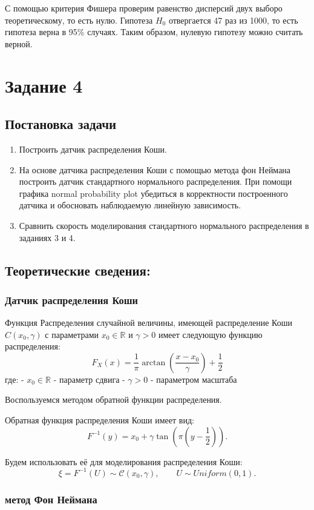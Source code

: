 \documentclass[11pt]{article}
\begin{document}
С помощью критерия Фишера проверим равенство дисперсий двух выборо теоретическому, то есть нулю. Гипотеза $H_0$ отвергается 47 раз из 1000, то есть гипотеза верна в 95\% случаях. Таким образом, нулевую гипотезу можно считать верной.

\section{Задание 4}
\subsection{Постановка задачи}

\begin{enumerate}
\item Построить датчик распределения Коши.
\item На основе датчика распределения Коши с помощью метода фон Неймана построить датчик стандартного нормального распределения. При помощи графика normal probability plot убедиться в корректности построенного датчика и обосновать наблюдаемую линейную зависимость.
\item Сравнить скорость моделирования стандартного нормального распределения в заданиях 3 и 4.
\end{enumerate}

\subsection{Теоретические сведения:}
\subsubsection{Датчик распределения Коши}
Функция Распределения случайной величины, имеющей распределение Коши $C(x_0, \gamma)$ с параметрами $x_0 \in \mathbb R$ и $\gamma > 0$ имеет следующую функцию распределения:
$$
    F_X(x) = \frac{1}{\pi}\arctan(\frac{x - x_0}{\gamma}) + \frac{1}{2}
$$
где:
- $x_0 \in \mathbb R$ - параметр сдвига
- $\gamma > 0$ - параметром масштаба

Воспользуемся методом обратной функции распределения.

Обратная функция распределения Коши имеет вид:
$$
F^{-1}(y) = x_0 + \gamma \tan\!\left( \pi \left( y - \frac{1}{2} \right) \right).
$$

Будем использовать её для моделирования распределения Коши:
$$
\xi = F^{-1}(U) \sim \mathcal{C}(x_0, \gamma),
\qquad U \sim Uniform(0,1).
$$
\subsubsection{метод Фон Неймана}
\end{document}
